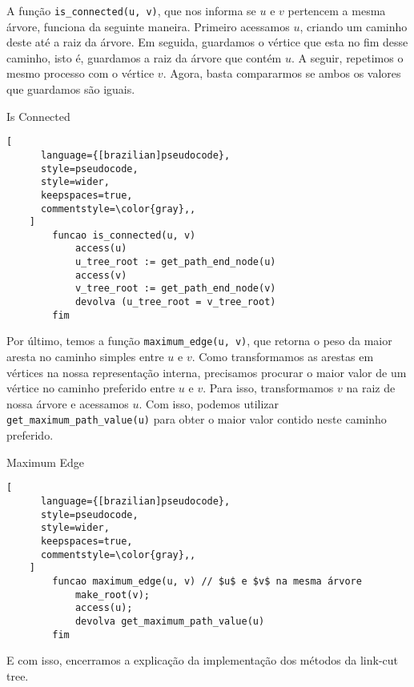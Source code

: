 A função \texttt{is\_connected(u, v)}, que nos informa se $u$ e $v$ pertencem a mesma árvore, funciona da seguinte maneira. Primeiro acessamos $u$, criando um caminho deste até a raiz da árvore. Em seguida, guardamos o vértice que esta no fim desse caminho, isto é, guardamos a raiz da árvore que contém $u$. A seguir, repetimos o mesmo processo com o vértice $v$. Agora, basta compararmos se ambos os valores que guardamos são iguais.

\begin{programruledcaption}{Is Connected\label{lct:is-connected}}
    \begin{lstlisting}[
      language={[brazilian]pseudocode},
      style=pseudocode,
      style=wider,
      keepspaces=true,
      commentstyle=\color{gray},,
    ]
        funcao is_connected(u, v)
            access(u)
            u_tree_root := get_path_end_node(u)
            access(v)
            v_tree_root := get_path_end_node(v)
            devolva (u_tree_root = v_tree_root)
        fim
    \end{lstlisting}
\end{programruledcaption}

Por último, temos a função \texttt{maximum\_edge(u, v)}, que retorna o peso da maior aresta no caminho simples entre $u$ e $v$. Como transformamos as arestas em vértices na nossa representação interna, precisamos procurar o maior valor de um vértice no caminho preferido entre $u$ e $v$. Para isso, transformamos $v$ na raiz de nossa árvore e acessamos $u$. Com isso, podemos utilizar \texttt{get\_maximum\_path\_value(u)} para obter o maior valor contido neste caminho preferido.

\begin{programruledcaption}{Maximum Edge\label{lct:max-edge}}
    \begin{lstlisting}[
      language={[brazilian]pseudocode},
      style=pseudocode,
      style=wider,
      keepspaces=true,
      commentstyle=\color{gray},,
    ]
        funcao maximum_edge(u, v) // $u$ e $v$ na mesma árvore
            make_root(v);
            access(u);
            devolva get_maximum_path_value(u)
        fim
    \end{lstlisting}
\end{programruledcaption}

E com isso, encerramos a explicação da implementação dos métodos da link-cut tree.

